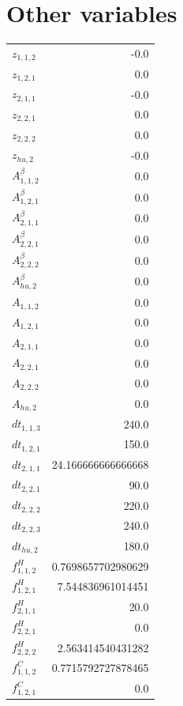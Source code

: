 \documentclass{article}%
\makeatletter
\let\mcnewpage=\newpage%
\newcommand{\TrickSupertabularIntoMulticols}{%
\renewcommand\newpage{%
\if@firstcolumn%
\hrule width\linewidth height0pt%
\columnbreak%
\else%
\mcnewpage%
\fi%
}%
}%
\makeatother
\begin{document}
\section{Other variables}%
\thispagestyle{plain}%
\begin{multicols*}{3}%
\TrickSupertabularIntoMulticols%
%
\begin{supertabular}{lr}%
	$z_{1,1,2}$ & -0.0 \\%
	$z_{1,2,1}$ & 0.0 \\%
	$z_{2,1,1}$ & -0.0 \\%
	$z_{2,2,1}$ & 0.0 \\%
	$z_{2,2,2}$ & 0.0 \\%
	$z_{hu,2}$ & -0.0 \\%
	$A_{1,1,2}^{\beta}$ & 0.0 \\%
	$A_{1,2,1}^{\beta}$ & 0.0 \\%
	$A_{2,1,1}^{\beta}$ & 0.0 \\%
	$A_{2,2,1}^{\beta}$ & 0.0 \\%
	$A_{2,2,2}^{\beta}$ & 0.0 \\%
	$A_{hu,2}^{\beta}$ & 0.0 \\%
	$A_{1,1,2}$ & 0.0 \\%
	$A_{1,2,1}$ & 0.0 \\%
	$A_{2,1,1}$ & 0.0 \\%
	$A_{2,2,1}$ & 0.0 \\%
	$A_{2,2,2}$ & 0.0 \\%
	$A_{hu,2}$ & 0.0 \\%
	$dt_{1,1,3}$ & 240.0 \\%
	$dt_{1,2,1}$ & 150.0 \\%
	$dt_{2,1,1}$ & 24.166666666666668 \\%
	$dt_{2,2,1}$ & 90.0 \\%
	$dt_{2,2,2}$ & 220.0 \\%
	$dt_{2,2,3}$ & 240.0 \\%
	$dt_{hu,2}$ & 180.0 \\%
	$f_{1,1,2}^{H}$ & 0.7698657702980629 \\%
	$f_{1,2,1}^{H}$ & 7.544836961014451 \\%
	$f_{2,1,1}^{H}$ & 20.0 \\%
	$f_{2,2,1}^{H}$ & 0.0 \\%
	$f_{2,2,2}^{H}$ & 2.563414540431282 \\%
	$f_{1,1,2}^{C}$ & 0.7715792727878465 \\%
	$f_{1,2,1}^{C}$ & 0.0 \\%

\end{supertabular}
\end{multicols*}
\end{document}
